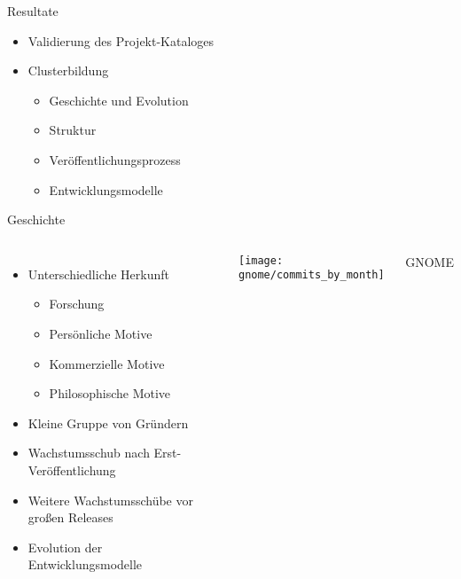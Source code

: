 \documentclass[11pt]{beamer}
\newlength{\colwidth}
\begin{document}
\begin{frame}[T]{Resultate}
  \begin{itemize}
    \item Validierung des Projekt-Kataloges
    \item Clusterbildung
    \begin{itemize}
      \item Geschichte und Evolution
      \item Struktur
      \item Veröffentlichungsprozess
      \item Entwicklungsmodelle
    \end{itemize}
  \end{itemize}
\end{frame}

\begin{frame}{Geschichte}
  \begin{columns}
  \column{\colwidth}
  \begin{itemize}
    \item Unterschiedliche Herkunft
    \begin{itemize}
      \item Forschung
      \item Persönliche Motive
      \item Kommerzielle Motive
      \item Philosophische Motive
    \end{itemize}
    \item Kleine Gruppe von Gründern
    \item Wachstumsschub nach Erst-Veröffentlichung
    \item Weitere Wachstumsschübe vor großen Releases
    \item Evolution der Entwicklungsmodelle
  \end{itemize}
  \column{\colwidth}
    \texttt{[image: gnome/commits\_by\_month]}

    {\tiny\hfill
    GNOME
    }
  \end{columns}
\end{frame}
\end{document}

